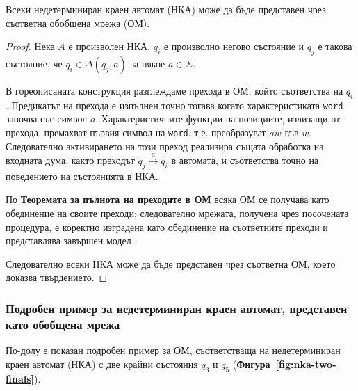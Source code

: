 \bigskip
\noindent

\begin{Theorem}\label{thm:nka-om}
Всеки недетерминиран краен автомат (НКА) може да бъде представен чрез съответна обобщена мрежа (ОМ).
\end{Theorem}

\renewcommand{\proofname}{Доказателство}
\begin{proof}
Нека $A$ е произволен НКА, $q_i$ е произволно негово състояние и $q_j$ е такова състояние, че $q_i \in \Delta(q_j,a)$ за някое $a \in \Sigma$.

В гореописаната конструкция разглеждаме прехода в ОМ, който съответства на $q_i$. Предикатът на прехода е изпълнен точно тогава когато характеристиката \texttt{word} започва със символ $a$. Характеристичните функции на позициите, излизащи от прехода, премахват първия символ на \texttt{word}, т.е. преобразуват $aw$ във $w$. Следователно активирането на този преход реализира същата обработка на входната дума, както преходът $q_j \xrightarrow{a} q_i$ в автомата, и съответства точно на поведението на състоянията в НКА.

По \textbf{Теоремата за пълнота на преходите в ОМ} всяка ОМ се получава като обединение на своите преходи; следователно мрежата, получена чрез посочената процедура, е коректно изградена като обединение на съответните преходи и представлява завършен модел \cite{Z1, BAM}.

Следователно всеки НКА може да бъде представен чрез съответна ОМ, което доказва твърдението.
\end{proof}


\subsubsection{Подробен пример за недетерминиран краен автомат, представен като обобщена мрежа}

\hspace*{2.5em}По-долу е показан подробен пример за ОМ, съответстваща на недетерминиран краен автомат (НКА) с две крайни състояния $q_3$ и $q_5$ (\textbf{Фигура~\ref{fig:nka-two-finals}}).


